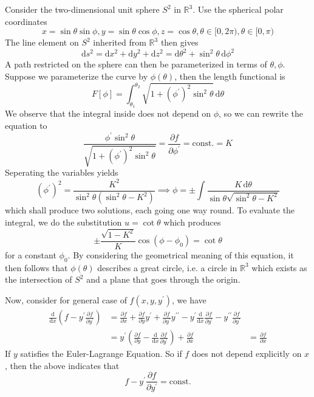 \begin{example}
    Consider the two-dimensional unit sphere $S^2$ in $\mathbb R^3$.
    Use the spherical polar coordinates
    $$x=\sin\theta\sin\phi,y=\sin\theta\cos\phi,z=\cos\theta,\theta\in [0,2\pi),\theta\in[0,\pi)$$
    The line element on $S^2$ inherited from $\mathbb R^3$ then gives
    $$\mathrm ds^2=\mathrm dx^2+\mathrm dy^2+\mathrm dz^2=\mathrm d\theta^2+\sin^2\theta\,\mathrm d\phi^2$$
    A path restricted on the sphere can then be parameterized in terms of $\theta,\phi$.
    Suppose we parameterize the curve by $\phi(\theta)$, then the length functional is
    $$F[\phi]=\int_{\theta_1}^{\theta_2}\sqrt{1+(\phi^\prime)^2\sin^2\theta}\,\mathrm d\theta$$
    We observe that the integral inside does not depend on $\phi$, so we can rewrite the equation to
    $$\frac{\phi^\prime\sin^2\theta}{\sqrt{1+(\phi^\prime)^2\sin^2\theta}}=\frac{\partial f}{\partial \phi^\prime}=\text{const.}=K$$
    Seperating the variables yields
    $$(\phi^\prime)^2=\frac{K^2}{\sin^2\theta(\sin^2\theta-K^2)}\implies\phi=\pm\int\frac{K\,\mathrm d\theta}{\sin\theta\sqrt{\sin^2\theta-K^2}}$$
    which shall produce two solutions, each going one way round.
    To evaluate the integral, we do the substitution $u=\cot\theta$ which produces
    $$\pm\frac{\sqrt{1-K^2}}{K}\cos(\phi-\phi_0)=\cot\theta$$
    for a constant $\phi_0$.
    By considering the geometrical meaning of this equation, it then follows that $\phi(\theta)$ describes a great circle, i.e. a circle in $\mathbb R^3$ which exists as the intersection of $S^2$ and a plane that goes through the origin.
\end{example}
Now, consider for general case of $f(x,y,y^\prime)$, we have
\begin{align*}
    \frac{\mathrm d}{\mathrm dx}\left( f-y^\prime\frac{\partial f}{\partial y^\prime} \right)&=\frac{\partial f}{\partial x}+\frac{\partial f}{\partial y}y^\prime+\frac{\partial f}{\partial y^\prime}y^{\prime\prime}-y^\prime\frac{\mathrm d}{\mathrm dx}\frac{\partial f}{\partial y^\prime}-y^{\prime\prime}\frac{\partial f}{\partial y^\prime}\\
    &=y^\prime\left( \frac{\partial f}{\partial y}-\frac{\mathrm d}{\mathrm dx}\frac{\partial f}{\partial y^\prime} \right)+\frac{\partial f}{\partial x}
    &=\frac{\partial f}{\partial x}
\end{align*}
If $y$ satisfies the Euler-Lagrange Equation.
So if $f$ does not depend explicitly on $x$, then the above indicates that
$$f-y^\prime\frac{\partial f}{\partial y^\prime}=\text{const.}$$
